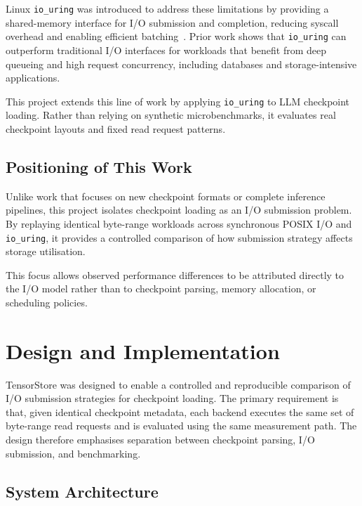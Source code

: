 \documentclass[]{final_report}
\begin{document}
Linux \texttt{io\_uring} was introduced to address these limitations by providing a shared-memory interface for I/O submission and completion, reducing syscall overhead and enabling efficient batching~\cite{AXBOE_IOURING_PDF,MAN7_IOURING7}. Prior work shows that \texttt{io\_uring} can outperform traditional I/O interfaces for workloads that benefit from deep queueing and high request concurrency, including databases and storage-intensive applications.

This project extends this line of work by applying \texttt{io\_uring} to LLM checkpoint loading. Rather than relying on synthetic microbenchmarks, it evaluates real checkpoint layouts and fixed read request patterns.

\section{Positioning of This Work}

Unlike work that focuses on new checkpoint formats or complete inference pipelines, this project isolates checkpoint loading as an I/O submission problem. By replaying identical byte-range workloads across synchronous POSIX I/O and \texttt{io\_uring}, it provides a controlled comparison of how submission strategy affects storage utilisation.

This focus allows observed performance differences to be attributed directly to the I/O model rather than to checkpoint parsing, memory allocation, or scheduling policies.





\chapter{Design and Implementation}
\label{chap:design}

TensorStore was designed to enable a controlled and reproducible comparison of I/O submission strategies for checkpoint loading. The primary requirement is that, given identical checkpoint metadata, each backend executes the same set of byte-range read requests and is evaluated using the same measurement path. The design therefore emphasises separation between checkpoint parsing, I/O submission, and benchmarking.

\section{System Architecture}
\end{document}
